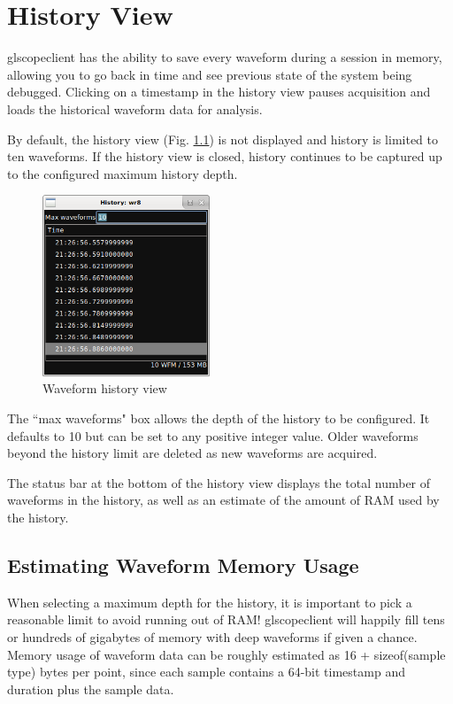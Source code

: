 \chapter{History View}
\label{sec:history}

glscopeclient has the ability to save every waveform during a session in memory, allowing you to go back in time and
see previous state of the system being debugged. Clicking on a timestamp in the history view pauses acquisition and
loads the historical waveform data for analysis.

By default, the history view (Fig. \ref{historyview}) is not displayed and history is limited to ten waveforms. If the
history view is closed, history continues to be captured up to the configured maximum history depth.

\begin{figure}[H]
\centering
\includegraphics[width=5cm]{images/history-view.png}
\caption{Waveform history view}
\label{historyview}
\end{figure}

The ``max waveforms" box allows the depth of the history to be configured. It defaults to 10 but can be set to any
positive integer value. Older waveforms beyond the history limit are deleted as new waveforms are acquired.

The status bar at the bottom of the history view displays the total number of waveforms in the history, as well as an
estimate of the amount of RAM used by the history.

\section{Estimating Waveform Memory Usage}

When selecting a maximum depth for the history, it is important to pick a reasonable limit to avoid running out of RAM!
glscopeclient will happily fill tens or hundreds of gigabytes of memory with deep waveforms if given a chance. Memory
usage of waveform data can be roughly estimated as 16 + sizeof(sample type) bytes per point, since each sample contains a
64-bit timestamp and duration plus the sample data.

